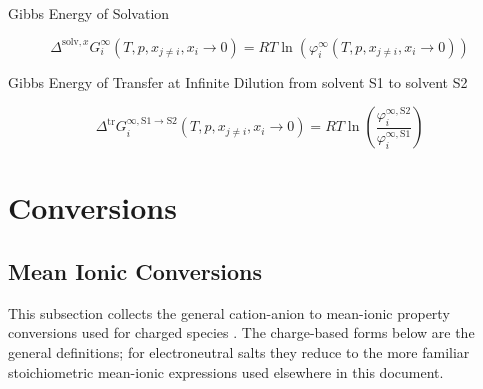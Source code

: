 \documentclass[12pt, letterpaper]{article}
\begin{document}
Gibbs Energy of Solvation


\begin{equation}
    \Delta^{\mathrm{solv},x}G_{i}^{\infty}(T,p,x_{j\neq i},x_{i}\to0)=RT\ln(\varphi_{i}^{\infty}(T,p,x_{j\neq i},x_{i}\to0))
    \label{eq:delta_g_solv_inf_x}
\end{equation}

Gibbs Energy of Transfer at Infinite Dilution from solvent S1 to solvent S2

\begin{equation}
    \Delta^{\mathrm{tr}}G_{i}^{\infty,\mathrm{S}1\to\mathrm{S}2}(T,p,x_{j\neq i},x_{i}\rightarrow0)=RT\ln\left(\frac{\varphi_{i}^{\infty,\mathrm{S}2}}{\varphi_{i}^{\infty,\mathrm{S}1}}\right)
    \label{eq:delta_g_transfer_inf}
\end{equation}

\section{Conversions}

\subsection{Mean Ionic Conversions}

This subsection collects the general cation-anion to mean-ionic property conversions used for charged species \cite{Ascani2022}. The charge-based forms below are the general definitions; for electroneutral salts they reduce to the more familiar stoichiometric mean-ionic expressions used elsewhere in this document.

\end{document}
